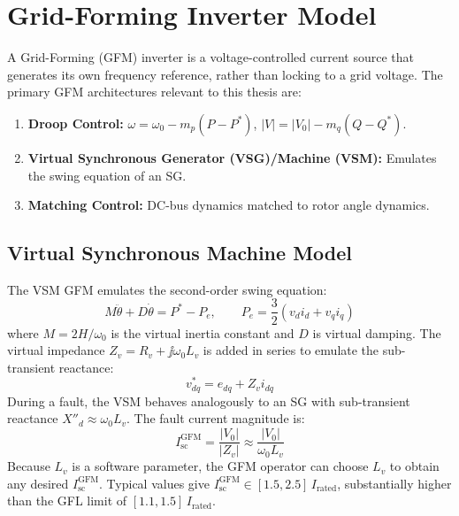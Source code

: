 \section{Grid-Forming Inverter Model}
\label{sec:ch2_gfm}

A Grid-Forming (GFM) inverter is a voltage-controlled current source that
generates its own frequency reference, rather than locking to a grid voltage.
The primary GFM architectures relevant to this thesis are:

\begin{enumerate}
\item \textbf{Droop Control:} $\omega = \omega_0 - m_p(P - P^\ast)$,
      $|V| = |V_0| - m_q(Q - Q^\ast)$.
\item \textbf{Virtual Synchronous Generator (VSG)/Machine (VSM):}
      Emulates the swing equation of an SG.
\item \textbf{Matching Control:} DC-bus dynamics matched to rotor angle dynamics.
\end{enumerate}

\subsection{Virtual Synchronous Machine Model}

The VSM GFM emulates the second-order swing equation:
\begin{equation}
  M\ddot{\theta} + D\dot{\theta} = P^\ast - P_e, \qquad
  P_e = \frac{3}{2}(v_d i_d + v_q i_q)
  \label{eq:ch2_vsm_swing}
\end{equation}
where $M = 2H/\omega_0$ is the virtual inertia constant and $D$ is virtual
damping. The virtual impedance $Z_v = R_v + \jj\omega_0 L_v$ is added in
series to emulate the sub-transient reactance:
\begin{equation}
  v^\ast_{dq} = e_{dq} + Z_v i_{dq}
  \label{eq:ch2_vsm_vi}
\end{equation}
During a fault, the VSM behaves analogously to an SG with sub-transient
reactance $X''_d \approx \omega_0 L_v$. The fault current magnitude is:
\begin{equation}
  I_\mathrm{sc}^\mathrm{GFM} = \frac{|V_0|}{|Z_v|} \approx \frac{|V_0|}{\omega_0 L_v}
  \label{eq:ch2_gfm_isc}
\end{equation}
Because $L_v$ is a software parameter, the GFM operator can choose $L_v$
to obtain any desired $I_\mathrm{sc}^\mathrm{GFM}$. Typical values give
$I_\mathrm{sc}^\mathrm{GFM} \in [1.5, 2.5]\,I_\mathrm{rated}$,
substantially higher than the GFL limit of $[1.1, 1.5]\,I_\mathrm{rated}$.

